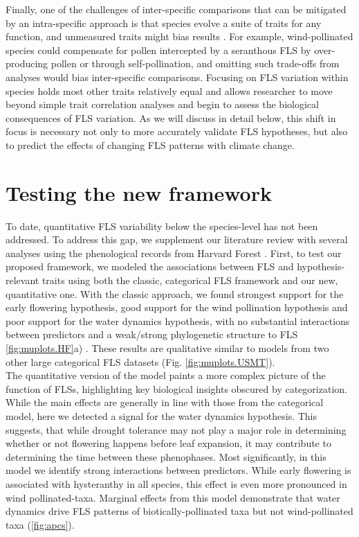 \documentclass{article}
\begin{document}
\noindent Finally, one of the challenges of inter-specific comparisons that can be mitigated by an intra-specific approach is that species evolve a suite of traits for any function, and unmeasured traits might bias results \citep{Davies2019}. For example, wind-pollinated species could compensate for pollen intercepted by a seranthous FLS by over-producing pollen or through self-pollination, and omitting such trade-offs from analyses would bias inter-specific comparisons. Focusing on FLS variation within species holds most other traits relatively equal and allows researcher to move beyond simple trait correlation analyses and begin to assess the biological consequences of FLS variation. As we will discuss in detail below, this shift in focus is necessary not only to more accurately validate FLS hypotheses, but also to predict the effects of changing FLS patterns with climate change. \\


\section*{Testing the new framework}

To date, quantitative FLS variability below the species-level has not been addressed. To address this gap, we supplement our literature review with several analyses using the phenological records from Harvard Forest \citep{OKeefe2015}. First, to test our proposed framework, we modeled the associations between FLS and hypothesis-relevant traits using both the classic, categorical FLS framework and our new, quantitative one. With the classic approach, we found strongest support for the early flowering hypothesis, good support for the wind pollination hypothesis and poor support for the water dynamics hypothesis, with no substantial interactions between predictors and a weak/strong phylogenetic structure to FLS \ref{fig:muplots.HF}a) . These results are qualitative similar to models from two other large categorical FLS datasets (Fig. \ref{fig:muplots.USMT}). \\

\noindent The quantitative version of the model paints a more complex picture of the function of FLSs, highlighting key biological insights obscured by categorization. While the main effects are generally in line with those from the categorical model, here we detected a signal for the water dynamics hypothesis. This suggests, that while drought tolerance may not play a major role in determining whether or not flowering happens before leaf expansion, it may contribute to determining the time between these phenophases. Most significantly, in this model we identify strong interactions between predictors. While early flowering is associated with hysteranthy in all species, this effect is even more pronounced in wind pollinated-taxa. Marginal effects from this model demonstrate that water dynamics drive FLS patterns of biotically-pollinated taxa but not wind-pollinated taxa (\ref{fig:apcs}). \\
\end{document}
